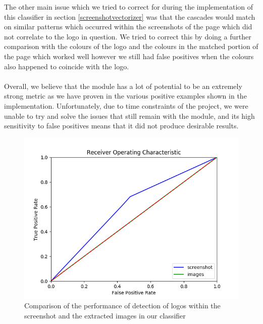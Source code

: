\documentclass[12pt,twoside]{report}
\begin{document}
The other main issue which we tried to correct for during the implementation of this classifier in section \ref{screenshotvectorizer} was that the cascades would match on similar patterns which occurred within the screenshots of the page which did not correlate to the logo in question. We tried to correct this by doing a further comparison with the colours of the logo and the colours in the matched portion of the page which worked well however we still had false positives when the colours also happened to coincide with the logo.
\\\\
Overall, we believe that the module has a lot of potential to be an extremely strong metric as we have proven in the various positive examples shown in the implementation. Unfortunately, due to time constraints of the project, we were unable to try and solve the issues that still remain with the module, and its high sensitivity to false positives means that it did not produce desirable results. 
\begin{figure}
    \centering
    \includegraphics[width=0.6\linewidth]{images/ROC_screenshotimages.png}
    \caption{Comparison of the performance of detection of logos within the screenshot and the extracted images in our classifier}
    \label{fig:rocscreenshotimages}
\end{figure}
\end{document}
